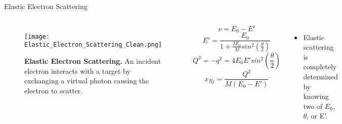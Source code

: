 \documentclass[10pt]{beamer}
\begin{document}
\begin{frame}[fragile]{Elastic Electron Scattering}
  \begin{columns}[T,onlytextwidth]

		\begin{figure}[!ht]
		\begin{center}
		\texttt{[image: Elastic\_Electron\_Scattering\_Clean.png]}
		\end{center}
		\caption{
		{\bf{Elastic Electron Scattering.}} An incident electron interacts with a target by exchanging a virtual 		photon causing the electron to scatter.}
		\label{fig:elastic_scattering}
		\end{figure}

    		\vspace{4mm}
		\begin{equation} \label{eq:nu}
			\nu = E_0-E'
		\end{equation}
		\vspace{4mm}
		\begin{equation} \label{eq:E'}
			E' = \frac{E_0}{1+\frac{2E_0}{M}sin^2\left(\frac{\theta}{2}\right)}
		\end{equation}
    		\vspace{4mm}
    		\begin{equation} \label{eq:Q^2}
			Q^2 = -q^2 = 4E_0E'sin^2\left(\frac{\theta}{2}\right)
		\end{equation}
		\vspace{4mm}
		\begin{equation} \label{eq:xbj}
			x_{Bj} = \frac{Q^2}{M(E_0-E')} 
		\end{equation}

      \begin{itemize}
        \item<2-> Elastic scattering is completely determined by knowing two of \alert{$E_0$}, \alert{$\theta$}, or \alert{E'}.
      \end{itemize}
  \end{columns}
\end{frame}
\end{document}
